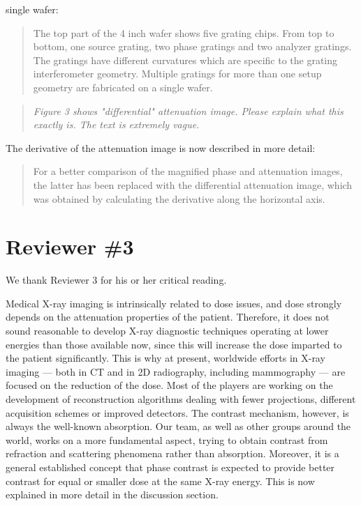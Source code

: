 \documentclass[a4paper,english]{scrartcl}
\newenvironment{reviewerquote}{\begin{quote}\itshape}{\end{quote}}
\begin{document}
single wafer:
\begin{quote}
    The top part of the 4 inch wafer shows
        five grating chips. From top to bottom, one source grating, two
        phase gratings and two analyzer gratings. The
        gratings have different curvatures which are specific to the grating
        interferometer geometry. Multiple gratings for more than one setup
        geometry are fabricated on a single wafer.
\end{quote}
\begin{reviewerquote}
    Figure 3 shows "differential" attenuation image. Please explain what this exactly is. The text is extremely vague.
\end{reviewerquote}
The derivative of the attenuation image is now described in more detail:
\begin{quote}
    For a better comparison of the magnified phase and
attenuation images, the latter has been replaced with the differential
attenuation image, which was obtained by calculating the derivative along
the horizontal axis.
\end{quote}

\section*{Reviewer \#3}
We thank Reviewer 3 for his or her critical reading.

Medical X-ray imaging is intrinsically related to dose issues, and dose
strongly depends on the attenuation properties of the patient.
Therefore, it does not sound reasonable to develop X-ray diagnostic
techniques operating at lower energies than those available now, since this will
increase the dose imparted to the patient significantly. This is why at
present, worldwide efforts in
X-ray imaging --- both in CT and in 2D radiography, including
mammography ---
are focused on the reduction of the dose. Most of the players are working on
the development of reconstruction algorithms dealing with fewer
projections, different acquisition schemes or improved detectors. The
contrast mechanism, however, is always the well-known absorption. Our team,
as well as other groups around the world, works on a more fundamental
aspect, trying to obtain contrast  from refraction and scattering phenomena
rather than absorption. Moreover, it is a general established concept that
phase contrast is expected to provide better contrast for equal or smaller dose
at the same X-ray energy. This is now explained in more detail in the
discussion section.
\end{document}
